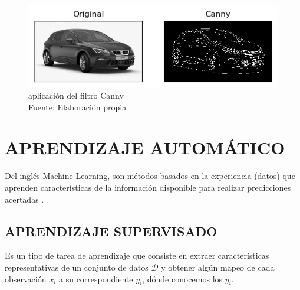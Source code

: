         \begin{figure}[H]
            \centering
            \includegraphics[scale=0.55]{imagenes/canny}
            \caption{aplicación del filtro Canny\\ Fuente: Elaboración propia}
        \end{figure}

\section{APRENDIZAJE AUTOMÁTICO}
    Del inglés Machine Learning, son métodos basados en la experiencia (datos) que aprenden características de la información disponible para realizar predicciones acertadas \citep{10.5555/3360093}.
    \subsection{APRENDIZAJE SUPERVISADO}
        Es un tipo de tarea de aprendizaje que consiste en extraer características representativas de un conjunto de datos $\mathcal{D}$ y obtener algún mapeo de cada observación $x_i$ a su correspondiente $y_i$, dónde conocemos los $y_i$.
    

